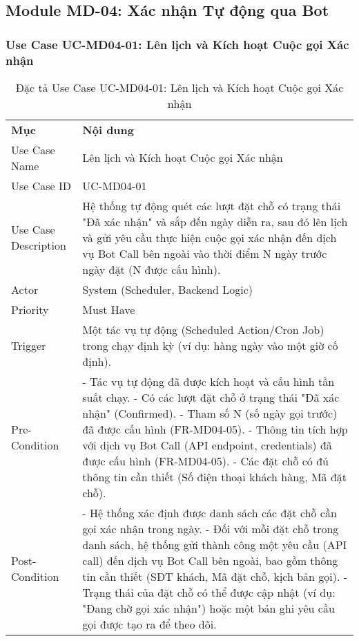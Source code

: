 \subsection{Module MD-04: Xác nhận Tự động qua Bot}

\subsubsection{Use Case UC-MD04-01: Lên lịch và Kích hoạt Cuộc gọi Xác nhận}

\begin{longtable}{|m{4cm}|p{11cm}|}
\caption{Đặc tả Use Case UC-MD04-01: Lên lịch và Kích hoạt Cuộc gọi Xác nhận} \label{tab:uc_md04_01} \\
\hline

\endhead %
\hline
\endfoot %
\hline
\endlastfoot %
\multicolumn{2}{|c|}{\textbf{2.1. Tóm tắt (Summary)}} \\
\hline
\textbf{Mục} & \textbf{Nội dung} \\
\hline
Use Case Name & Lên lịch và Kích hoạt Cuộc gọi Xác nhận \\
\hline
Use Case ID & UC-MD04-01 \\
\hline
Use Case Description & Hệ thống tự động quét các lượt đặt chỗ có trạng thái "Đã xác nhận" và sắp đến ngày diễn ra, sau đó lên lịch và gửi yêu cầu thực hiện cuộc gọi xác nhận đến dịch vụ Bot Call bên ngoài vào thời điểm N ngày trước ngày đặt (N được cấu hình). \\
\hline
Actor & System (Scheduler, Backend Logic) \\
\hline
Priority & Must Have \\
\hline
Trigger & Một tác vụ tự động (Scheduled Action/Cron Job) trong  chạy định kỳ (ví dụ: hàng ngày vào một giờ cố định). \\
\hline
Pre-Condition & - Tác vụ tự động đã được kích hoạt và cấu hình tần suất chạy. \newline - Có các lượt đặt chỗ ở trạng thái "Đã xác nhận" (Confirmed). \newline - Tham số N (số ngày gọi trước) đã được cấu hình (FR-MD04-05). \newline - Thông tin tích hợp với dịch vụ Bot Call (API endpoint, credentials) đã được cấu hình (FR-MD04-05). \newline - Các đặt chỗ có đủ thông tin cần thiết (Số điện thoại khách hàng, Mã đặt chỗ). \\
\hline
Post-Condition & - Hệ thống xác định được danh sách các đặt chỗ cần gọi xác nhận trong ngày. \newline - Đối với mỗi đặt chỗ trong danh sách, hệ thống gửi thành công một yêu cầu (API call) đến dịch vụ Bot Call bên ngoài, bao gồm thông tin cần thiết (SĐT khách, Mã đặt chỗ, kịch bản gọi). \newline - Trạng thái của đặt chỗ có thể được cập nhật (ví dụ: "Đang chờ gọi xác nhận") hoặc một bản ghi yêu cầu gọi được tạo ra để theo dõi. \\

\end{longtable}

